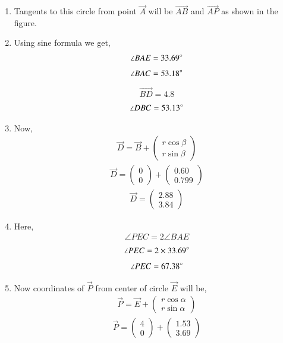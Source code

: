 \documentclass[journal,12pt,twocolumn]{IEEEtran}
\newcommand{\myvec}[1]{\ensuremath{\begin{pmatrix}#1\end{pmatrix}}}
\begin{document}
\begin{enumerate}
    \item Tangents to this circle from point $\vec{A}$ will be $\vec{AB}$ and $\vec{AP}$ as shown in the figure.\\
    \item Using sine formula we get,
    \begin{align}
    \angle BAE=33.69\degree
    \end{align}
    \begin{align}
        \angle BAC=53.18\degree
    \end{align}
    \begin{align}
       \vec{BD}= 4.8
    \end{align}
      \begin{align}
        \angle DBC=53.13\degree
    \end{align}
  \item   Now, \begin{align}
        \vec{D}= \vec{B}+\myvec{r\cos \beta\\r\sin \beta}
    \end{align}
    \begin{align}
     \vec{D}= \myvec{0\\0}+\myvec{0.60\\0.799}   
    \end{align}
    \begin{align}
        \vec{D}=\myvec{2.88\\3.84}
    \end{align}
\item Here,
\begin{align}
\angle PEC= 2\angle BAE
\end{align}
\begin{align}
    \angle PEC=2\times 33.69\degree
\end{align}
\begin{align}
    \angle PEC= 67.38\degree
\end{align}
\item Now coordinates of $\vec{P}$ from center of circle $\vec{E}$ will be,
\begin{align}
    \vec{P}= \vec{E}+\myvec{r\cos \alpha\\r\sin \alpha}
\end{align}
\begin{align}
    \vec{P}=\myvec{4\\0}+\myvec{1.53\\3.69}
\end{align}
\begin{align}

\end{align}
\end{enumerate}
\end{document}
